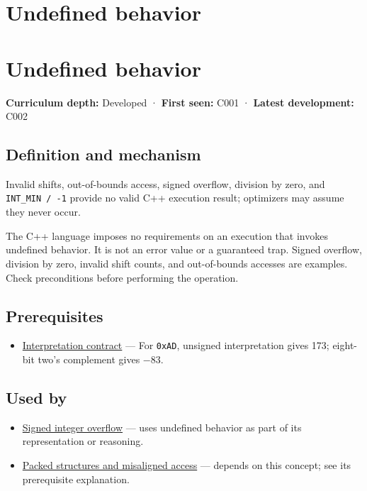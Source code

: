 \hypertarget{appendix-f558f5b4d8f2}{}
\section*{Undefined behavior}
\section{Undefined behavior}\label{appendix-f558f5b4d8f2-undefined-behavior}

\textbf{Curriculum depth:} Developed · \textbf{First seen:} C001 · \textbf{Latest development:} C002

\subsection{Definition and mechanism}\label{appendix-f558f5b4d8f2-definition-and-mechanism}

Invalid shifts, out-of-bounds access, signed overflow, division by zero, and \texttt{INT\_MIN\ /\ -1} provide no valid C++ execution result; optimizers may assume they never occur.

The C++ language imposes no requirements on an execution that invokes undefined behavior. It is not an error value or a guaranteed trap. Signed overflow, division by zero, invalid shift counts, and out-of-bounds accesses are examples. Check preconditions before performing the operation.

\subsection{Prerequisites}\label{appendix-f558f5b4d8f2-prerequisites}

\begin{itemize}
\tightlist
\item
  \hyperref[appendix-f414bd4ed05c]{Interpretation contract} --- For \texttt{0xAD}, unsigned interpretation gives 173; eight-bit two's complement gives −83.
\end{itemize}

\subsection{Used by}\label{appendix-f558f5b4d8f2-used-by}

\begin{itemize}
\item
  \hyperref[appendix-1a599c924a4e]{Signed integer overflow} --- uses undefined behavior as part of its representation or reasoning.
\item
  \hyperref[appendix-0682dbfc5f0e]{Packed structures and misaligned access} --- depends on this concept; see its prerequisite explanation.
\end{itemize}

